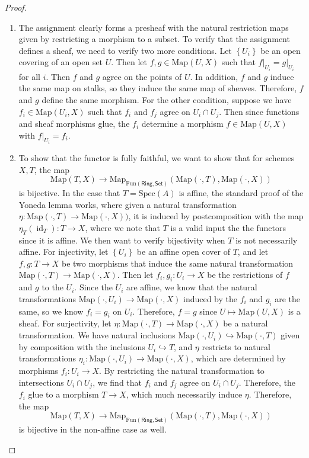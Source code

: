 \documentclass[psamsfonts, 12pt]{amsart}
\theoremstyle{definition}
\theoremstyle{remark}
\newcommand{\set}[1]{\left\lbrace #1 \right\rbrace}
\newcommand{\enumbreak}{\ \\ \vspace{-\baselineskip}}
\DeclareMathOperator{\id}{id}
\begin{document}
\begin{proof} \enumbreak
\begin{enumerate}
  \item The assignment clearly forms a presheaf with the natural restriction maps
  given by restricting a morphism to a subset. To verify that the assignment
  defines a sheaf, we need to verify two more conditions. Let $\set{U_i}$ be
  an open covering of an open set $U$. Then let $f,g \in \mathrm{Map}(U,X)$
  such that $f\vert_{U_i} = g\vert_{U_i}$ for all $i$. Then $f$ and $g$ agree
  on the points of $U$. In addition, $f$ and $g$ induce the same map on stalks,
  so they induce the same map of sheaves. Therefore, $f$ and $g$ define the same
  morphism. For the other condition, suppose we have $f_i \in \mathrm{Map}(U_i,X)$
  such that $f_i$ and $f_j$ agree on $U_i \cap U_j$. Then since functions and
  sheaf morphisms glue, the $f_i$ determine a morphism $f \in \mathrm{Map}(U,X)$
  with $f\vert_{U_i} = f_i$.
  \item To show that the functor is fully faithful, we want to show that for
  schemes $X,T$, the map
  \[
  \mathrm{Map}(T,X) \to
  \mathrm{Map}_{\mathrm{Fun}(\mathsf{Ring},\mathsf{Set})}
  (\mathrm{Map}(\cdot, T), \mathrm{Map}(\cdot, X))
  \]
  is bijective. In the case that $T = \mathrm{Spec}(A)$ is affine, the standard
  proof of the Yoneda lemma works, where given a natural transformation
  $\eta : \mathrm{Map}(\cdot, T) \to \mathrm{Map}(\cdot, X))$, it is induced by
  postcomposition with the map $\eta_T(\id_T) : T \to X$, where we note that $T$
  is a valid input the the functors since it is affine. We then want to verify
  bijectivity when $T$ is not necessarily affine. For injectivity, let $\set{U_i}$
  be an affine open cover of $T$, and let $f,g : T \to X$ be two morphisms that
  induce the same natural transformation
  $\mathrm{Map}(\cdot,T) \to \mathrm{Map}(\cdot,X)$. Then let $f_i,g_i : U_i \to X$
  be the restrictions of $f$ and $g$ to the $U_i$. Since the $U_i$ are affine,
  we know that the natural transformations
  $\mathrm{Map}(\cdot,U_i) \to \mathrm{Map}(\cdot,X)$ induced by the $f_i$ and $g_i$
  are the same, so we know $f_i = g_i$ on $U_i$. Therefore, $f = g$ since
  $U \mapsto \mathrm{Map}(U,X)$ is a sheaf. For surjectivity, let
  $\eta : \mathrm{Map}(\cdot,T) \to \mathrm{Map}(\cdot,X)$ be a natural transformation.
  We have natural inclusions
  $\mathrm{Map}(\cdot, U_i) \hookrightarrow \mathrm{Map}(\cdot, T)$ given by
  composition with the inclusions $U_i \hookrightarrow T$, and $\eta$ restricts
  to natural transformations
  $\eta_i : \mathrm{Map}(\cdot, U_i) \to \mathrm{Map}(\cdot, X)$, which are determined
  by morphisms $f_i : U_i \to X$. By restricting the natural transformation to
  intersections $U_i \cap U_j$, we find that $f_i$ and $f_j$ agree on $U_i \cap U_j$.
  Therefore, the $f_i$ glue to a morphism $T \to X$, which much necessarily induce
  $\eta$. Therefore, the map
  \[
  \mathrm{Map}(T,X) \to
  \mathrm{Map}_{\mathrm{Fun}(\mathsf{Ring},\mathsf{Set})}
  (\mathrm{Map}(\cdot, T), \mathrm{Map}(\cdot, X))
  \]
  is bijective in the non-affine case as well.
\end{enumerate}
\end{proof}
\end{document}

